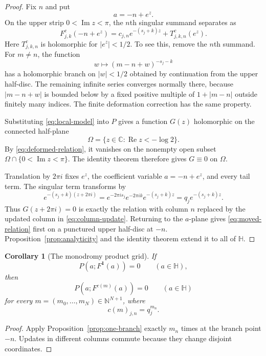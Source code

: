 \documentclass[11pt,reqno]{amsart}
\newtheorem{corollary}[theorem]{Corollary}
\theoremstyle{definition}
\theoremstyle{remark}
\newcommand{\C}{\mathbb C}
\newcommand{\N}{\mathbb N}
\newcommand{\HH}{\mathbb H}
\begin{document}
\begin{proof}
Fix $n$ and put
\[
  a=-n+e^z.
\]
On the upper strip $0<\operatorname{Im}z<\pi$, the $n$th singular summand
separates as
\begin{equation}\label{eq:local-model}
  F_{j,k}^{c}(-n+e^z)
  =c_{j,n}e^{-(s_j+k)z}+T_{j,k,n}^{c}(e^z).
\end{equation}
Here $T_{j,k,n}^{c}$ is holomorphic for $|e^z|<1/2$.  To see this, remove
the $n$th summand.  For $m\neq n$, the function
\[
  w\longmapsto(m-n+w)^{-s_j-k}
\]
has a holomorphic branch on $|w|<1/2$ obtained by continuation from the
upper half-disc.  The remaining infinite series converges normally there,
because $|m-n+w|$ is bounded below by a fixed positive multiple of
$1+|m-n|$ outside finitely many indices.  The finite deformation correction
has the same property.

Substituting \eqref{eq:local-model} into $P$ gives a function $G(z)$
holomorphic on the connected half-plane
\[
  \Omega=\{z\in\C:\operatorname{Re}z<-\log2\}.
\]
By \eqref{eq:deformed-relation}, it vanishes on the nonempty open subset
$\Omega\cap\{0<\operatorname{Im}z<\pi\}$.  The identity theorem therefore
gives $G\equiv0$ on $\Omega$.

Translation by $2\pi i$ fixes $e^z$, the coefficient variable
$a=-n+e^z$, and every tail term.  The singular term transforms by
\[
  e^{-(s_j+k)(z+2\pi i)}
  =e^{-2\pi i s_j}e^{-2\pi i k}e^{-(s_j+k)z}
  =q_je^{-(s_j+k)z}.
\]
Thus $G(z+2\pi i)=0$ is exactly the relation with column $n$ replaced by
the updated column in \eqref{eq:column-update}.  Returning to the $a$-plane
gives \eqref{eq:moved-relation} first on a punctured upper half-disc at
$-n$.  Proposition~\ref{prop:analyticity} and the identity theorem extend it
to all of $\HH$.
\end{proof}

\begin{corollary}[The monodromy product grid]\label{cor:grid}
If
\[
  P(a;F^{\mathbf1}(a))=0\qquad(a\in\HH),
\]
then
\begin{equation}\label{eq:grid-relation}
  P(a;F^{c(m)}(a))=0\qquad(a\in\HH)
\end{equation}
for every $m=(m_0,\ldots,m_N)\in\N^{N+1}$, where
\begin{equation}\label{eq:grid-parameters}
  c(m)_{j,n}=q_j^{m_n}.
\end{equation}
\end{corollary}

\begin{proof}
Apply Proposition~\ref{prop:one-branch} exactly $m_n$ times at the branch
point $-n$.  Updates in different columns commute because they change
disjoint coordinates.
\end{proof}
\end{document}
